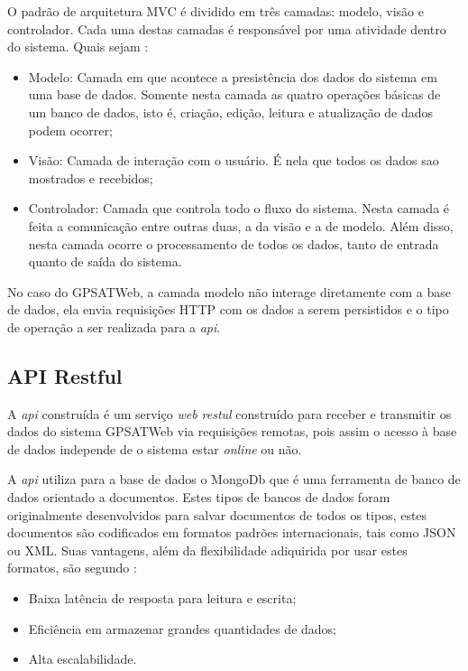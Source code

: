         O padrão de arquitetura MVC é dividido em três camadas: modelo, visão e controlador. Cada uma destas camadas é responsável por uma atividade dentro do sistema. Quais sejam \cite{Lemos2013}:
            \begin{itemize}
                \item Modelo: Camada em que acontece a presistência dos dados do sistema em uma base de dados. Somente nesta camada as quatro operações básicas de um banco de dados, isto é, criação, edição, leitura e atualização de dados podem ocorrer;
                \item Visão: Camada de interação com o usuário. É nela que todos os dados sao mostrados e recebidos;
                \item Controlador: Camada que controla todo o fluxo do sistema. Nesta camada é feita a comunicação entre outras duas, a da visão e a de modelo. Além disso, nesta camada ocorre o processamento de todos os dados, tanto de entrada quanto de saída do sistema.
            \end{itemize}

        No caso do GPSATWeb, a camada modelo não interage diretamente com a base de dados, ela envia requisições HTTP com os dados a serem persistidos e o tipo de operação a ser realizada para a \textit{api}. 
        
    \subsection{API Restful}
        A \textit{api} construída é um serviço \textit{web restul} construído para receber e transmitir os dados do sistema GPSATWeb via requisições remotas, pois assim o acesso à base de dados independe de o sistema estar \textit{online} ou não. 

        A \textit{api} utiliza para a base de dados o MongoDb que é uma ferramenta de banco de dados orientado a documentos. Estes tipos de bancos de dados foram originalmente desenvolvidos para salvar documentos de todos os tipos, estes documentos são codificados em formatos padrões internacionais, tais como JSON ou XML. Suas vantagens, além da flexibilidade adiquirida por usar estes formatos, são segundo \cite{Moniruzzaman2013}:
        \begin{itemize}
            \item Baixa latência de resposta para leitura e escrita;
            \item Eficiência em armazenar grandes quantidades de dados;
            \item Alta escalabilidade.
        \end{itemize}

